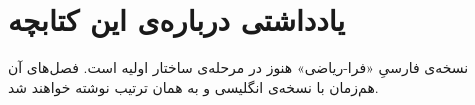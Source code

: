 \chapter*{یادداشتی درباره‌ی این کتابچه}

نسخه‌ی فارسیِ «فرا-ریاضی» هنوز در مرحله‌ی ساختار اولیه است. فصل‌های آن هم‌زمان با نسخه‌ی انگلیسی و به همان ترتیب نوشته خواهند شد.

